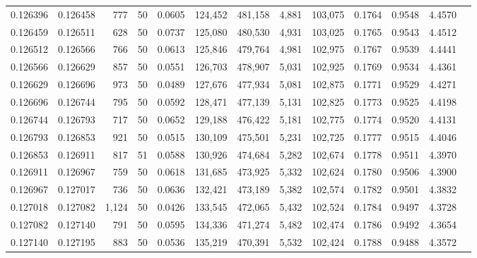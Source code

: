\begin{tabular}{rrrrrrrrrrrrr}
0.126396 & 0.126458 &   777 &  50 &                                     0.0605 & 124,452 & 481,158 &   4,881 & 103,075 & 0.1764 & 0.9548 & 4.4570 \\
0.126459 & 0.126511 &   628 &  50 &                                     0.0737 & 125,080 & 480,530 &   4,931 & 103,025 & 0.1765 & 0.9543 & 4.4512 \\
0.126512 & 0.126566 &   766 &  50 &                                     0.0613 & 125,846 & 479,764 &   4,981 & 102,975 & 0.1767 & 0.9539 & 4.4441 \\
0.126566 & 0.126629 &   857 &  50 &                                     0.0551 & 126,703 & 478,907 &   5,031 & 102,925 & 0.1769 & 0.9534 & 4.4361 \\
0.126629 & 0.126696 &   973 &  50 &                                     0.0489 & 127,676 & 477,934 &   5,081 & 102,875 & 0.1771 & 0.9529 & 4.4271 \\
0.126696 & 0.126744 &   795 &  50 &                                     0.0592 & 128,471 & 477,139 &   5,131 & 102,825 & 0.1773 & 0.9525 & 4.4198 \\
0.126744 & 0.126793 &   717 &  50 &                                     0.0652 & 129,188 & 476,422 &   5,181 & 102,775 & 0.1774 & 0.9520 & 4.4131 \\
0.126793 & 0.126853 &   921 &  50 &                                     0.0515 & 130,109 & 475,501 &   5,231 & 102,725 & 0.1777 & 0.9515 & 4.4046 \\
0.126853 & 0.126911 &   817 &  51 &                                     0.0588 & 130,926 & 474,684 &   5,282 & 102,674 & 0.1778 & 0.9511 & 4.3970 \\
0.126911 & 0.126967 &   759 &  50 &                                     0.0618 & 131,685 & 473,925 &   5,332 & 102,624 & 0.1780 & 0.9506 & 4.3900 \\
0.126967 & 0.127017 &   736 &  50 &                                     0.0636 & 132,421 & 473,189 &   5,382 & 102,574 & 0.1782 & 0.9501 & 4.3832 \\
0.127018 & 0.127082 & 1,124 &  50 &                                     0.0426 & 133,545 & 472,065 &   5,432 & 102,524 & 0.1784 & 0.9497 & 4.3728 \\
0.127082 & 0.127140 &   791 &  50 &                                     0.0595 & 134,336 & 471,274 &   5,482 & 102,474 & 0.1786 & 0.9492 & 4.3654 \\
0.127140 & 0.127195 &   883 &  50 &                                     0.0536 & 135,219 & 470,391 &   5,532 & 102,424 & 0.1788 & 0.9488 & 4.3572 \\

\end{tabular}
